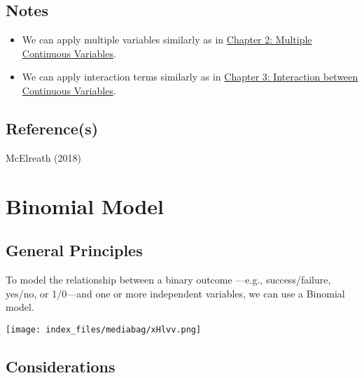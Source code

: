 \documentclass[
  letterpaper,
  DIV=11,
  numbers=noendperiod]{scrreprt}
\begin{document}
\section{Notes}\label{notes}

\begin{tcolorbox}[enhanced jigsaw, toptitle=1mm, opacityback=0, titlerule=0mm, breakable, bottomrule=.15mm, colframe=quarto-callout-note-color-frame, arc=.35mm, coltitle=black, left=2mm, opacitybacktitle=0.6, leftrule=.75mm, toprule=.15mm, rightrule=.15mm, bottomtitle=1mm, colbacktitle=quarto-callout-note-color!10!white, title=\textcolor{quarto-callout-note-color}{\faInfo}\hspace{0.5em}{Note}, colback=white]

\begin{itemize}
\item
  We can apply multiple variables similarly as in
  \href{2.\%20Multiple\%20continuous\%20Variables.qmd}{Chapter 2:
  Multiple Continuous Variables}.
\item
  We can apply interaction terms similarly as in
  \href{3.\%20Interaction\%20between\%20continuous\%20variables.qmd}{Chapter
  3: Interaction between Continuous Variables}.
\end{itemize}

\end{tcolorbox}

\section{Reference(s)}\label{references-3}

McElreath (2018)


\chapter{Binomial Model}\label{binomial-model}

\section{General Principles}\label{general-principles-4}

To model the relationship between a binary outcome ---e.g.,
success/failure, yes/no, or 1/0---and one or more independent variables,
we can use a Binomial model.

\texttt{[image: index\_files/mediabag/xHlvv.png]}

\section{Considerations}\label{considerations-4}
\end{document}
